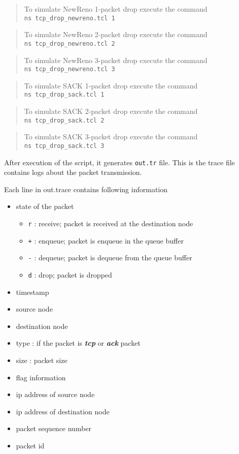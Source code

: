 \documentclass[11pt]{article}
\providecommand{\tightlist}{%
      \setlength{\itemsep}{0pt}\setlength{\parskip}{0pt}}
\begin{document}
\begin{quote}
To simulate NewReno 1-packet drop execute the command
\texttt{ns\ tcp\_drop\_newreno.tcl\ 1}
\end{quote}

\begin{quote}
To simulate NewReno 2-packet drop execute the command
\texttt{ns\ tcp\_drop\_newreno.tcl\ 2}
\end{quote}

\begin{quote}
To simulate NewReno 3-packet drop execute the command
\texttt{ns\ tcp\_drop\_newreno.tcl\ 3}
\end{quote}

\begin{quote}
To simulate SACK 1-packet drop execute the command
\texttt{ns\ tcp\_drop\_sack.tcl\ 1}
\end{quote}

\begin{quote}
To simulate SACK 2-packet drop execute the command
\texttt{ns\ tcp\_drop\_sack.tcl\ 2}
\end{quote}

\begin{quote}
To simulate SACK 3-packet drop execute the command
\texttt{ns\ tcp\_drop\_sack.tcl\ 3}
\end{quote}

After execution of the script, it generates \texttt{out.tr} file. This
is the trace file contains logs about the packet transmission.

Each line in out.trace contains following information

\begin{itemize}
\tightlist
\item
  state of the packet

  \begin{itemize}
  \tightlist
  \item
    \texttt{r} : receive; packet is received at the destination node
  \item
    \texttt{+} : enqueue; packet is enqueue in the queue buffer
  \item
    \texttt{-} : dequeue; packet is dequeue from the queue buffer
  \item
    \texttt{d} : drop; packet is dropped
  \end{itemize}
\item
  timestamp
\item
  source node
\item
  destination node
\item
  type : if the packet is \textbf{\emph{tcp}} or \textbf{\emph{ack}}
  packet
\item
  size : packet size
\item
  flag information
\item
  ip address of source node
\item
  ip address of destination node
\item
  packet sequence number
\item
  packet id
\end{itemize}
\end{document}
